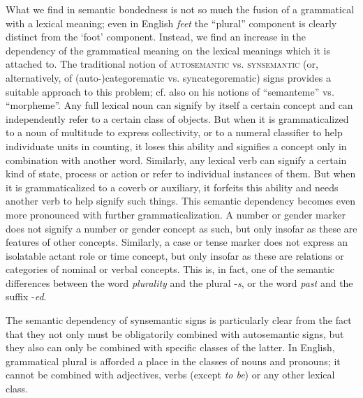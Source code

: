 What we find in semantic bondedness is not so much the fusion of a grammatical with a lexical meaning; even in English \textit{feet} the ``plural'' component is clearly distinct from the ‘foot’ component. Instead, we find an increase in the dependency of the grammatical meaning on the lexical meanings which it is attached to. The traditional notion of \textsc{autosemantic} vs. \textsc{synsemantic} (or, alternatively, of (auto-)categorematic vs. syncategorematic) signs provides a suitable approach to this problem; cf. also \citet[230 ]{Hjelmslev1928} on his notions of ``semanteme'' vs. ``morpheme''. Any full lexical noun can signify by itself a certain concept and can independently refer to a certain class of objects. But when it is grammaticalized to a noun of multitude to express collectivity, or to a numeral classifier to help individuate units in counting, it loses this ability and signifies a concept only in combination with another word. Similarly, any lexical verb can signify a certain kind of state, process or action or refer to individual instances of them. But when it is grammaticalized to a coverb or auxiliary, it forfeits this ability and needs another verb to help signify such things. This semantic dependency becomes even more pronounced with further grammaticalization. A number or gender marker does not signify a number or gender concept as such, but only insofar as these are features of other concepts. Similarly, a case or tense marker does not express an isolatable actant role or time concept, but only insofar as these are relations or categories of nominal or verbal concepts. This is, in fact, one of the semantic differences between the word \textit{plurality} and the plural -\textit{s}, or the word \textit{past} and the suffix -\textit{ed}.

The semantic dependency of synsemantic signs is particularly clear from the fact that they not only must be obligatorily combined with autosemantic signs, but they also can only be combined with specific classes of the latter. In English, grammatical plural is afforded a place in the classes of nouns and pronouns; it cannot be combined with adjectives, verbs (except \textit{to be}) or any other lexical class.

